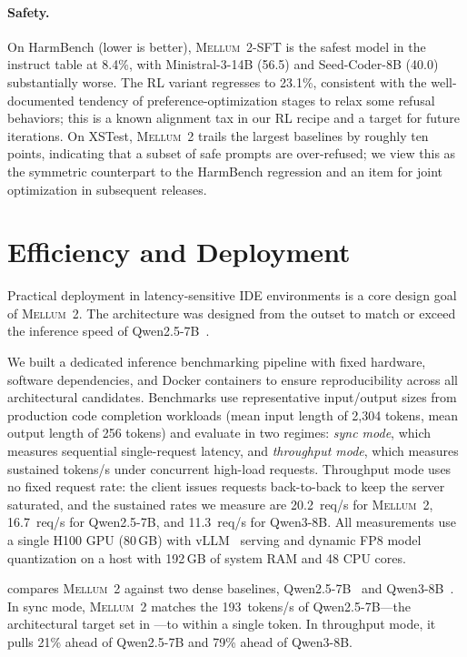 \documentclass[11pt,a4paper]{article}
\newcommand{\modelname}{\textsc{Mellum~2}\xspace}
\begin{document}
\paragraph{Safety.}
On HarmBench (lower is better), \modelname-SFT is the safest model in
the instruct table at 8.4\%, with Ministral-3-14B (56.5) and
Seed-Coder-8B (40.0) substantially worse. The RL variant regresses to
23.1\%, consistent with the well-documented tendency of
preference-optimization stages to relax some refusal behaviors;
this is a known alignment tax in our RL recipe and a target for
future iterations. On
XSTest, \modelname trails the largest baselines by roughly ten points,
indicating that a subset of safe prompts are over-refused; we view
this as the symmetric counterpart to the HarmBench regression and an
item for joint optimization in subsequent releases.

\section{Efficiency and Deployment}
\label{sec:efficiency}

Practical deployment in latency-sensitive IDE environments is a core design goal
of \modelname. The architecture was designed from the outset to match or exceed
the inference speed of Qwen2.5-7B~\cite{qwen2.5}.

We built a dedicated inference benchmarking pipeline with fixed hardware,
software dependencies, and Docker containers to ensure reproducibility across
all architectural candidates. Benchmarks use representative input/output sizes
from production code completion workloads (mean input length of 2{,}304 tokens,
mean output length of 256 tokens) and evaluate in two regimes: \emph{sync
mode}, which measures sequential single-request latency, and
\emph{throughput mode}, which measures sustained tokens/s under concurrent
high-load requests. Throughput mode uses no fixed request rate: the client
issues requests back-to-back to keep the server saturated, and the sustained
rates we measure are 20.2~req/s for \modelname, 16.7~req/s for Qwen2.5-7B,
and 11.3~req/s for Qwen3-8B. All measurements use a single H100 GPU (80\,GB) with
vLLM~\cite{kwon2023vllm} serving and dynamic FP8 model quantization on a host with 192\,GB
of system RAM and 48 CPU cores.

 compares \modelname against two dense
baselines, Qwen2.5-7B~\cite{qwen2.5} and Qwen3-8B~\cite{yang2025qwen3}. In sync
mode, \modelname matches the 193~tokens/s of Qwen2.5-7B---the architectural
target set in ---to within a single token. In
throughput mode, it pulls 21\% ahead of Qwen2.5-7B and 79\% ahead of Qwen3-8B.
\end{document}
